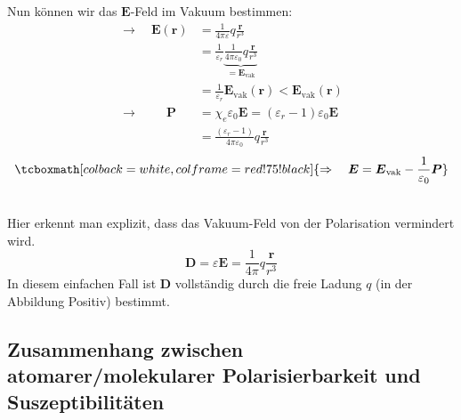 \documentclass[titlepage,11pt,a4paper,ngerman]{report}
\newcommand{\tx}[1]{\textrm{#1}}
\newcommand{\ub}[1]{\underbrace{#1}}
\newcommand{\eofr}{\vec{E}(\vec{r})}
\newcommand{\kq}{\frac{1}{4\pi\epsilon_0}}
\renewcommand{\vec}[1]{\boldsymbol{#1}}
\newcommand{\lcom}[1]{\color{MidnightBlue}#1\color{black}}
\renewcommand{\epsilon}{\varepsilon}
\newcommand{\rmbox}[1]{\tcboxmath[colback=white,colframe=red!75!black]{#1}}
\begin{document}
\noindent
\begin{minipage}{.6\linewidth}
	Nun können wir das $ \vec{E} $-Feld im Vakuum bestimmen:
	\begin{align*}
	\rightarrow \quad \eofr &= \frac{1}{4 \pi \epsilon} q \frac{\vec{r}}{r^3} \\
	&= \frac{1}{\epsilon_r} \ub{\kq q \frac{\vec{r}}{r^3}}_{= \vec{E}_{\tx{vak}}}\\
	&= \frac{1}{\epsilon_r} \vec{E}_{\tx{vak}} (\vec{r}) < \vec{E}_{\tx{vak}}(\vec{r})\\[10pt]
	\rightarrow \qquad \ \vec{P} &= \chi_e \epsilon_0 \vec{E} = (\epsilon_r - 1) \epsilon_0 \vec{E}\\
	&= \frac{(\epsilon_r - 1)}{4 \pi \epsilon_0} q \frac{\vec{r}}{r^3}
	\end{align*}
	\begin{equation*}
	\rmbox{\Rightarrow \quad \vec{E} = \vec{E}_{\tx{vak}} - \frac{1}{\epsilon_0} \vec{P}}
	\end{equation*}
	\vspace{3pt}
\end{minipage}%
\begin{minipage}{.4\linewidth}
	\centering
\end{minipage}%
\\
\lcom{Hier erkennt man explizit, dass das Vakuum-Feld von der Polarisation vermindert wird.}
\begin{equation*}
\vec{D} = \epsilon \vec{E} = \frac{1}{4 \pi} q \frac{\vec{r}}{r^3}
\end{equation*}
\lcom{In diesem einfachen Fall ist $ \vec{D} $ vollständig durch die freie Ladung $ q $ (in der Abbildung Positiv) bestimmt.}

\subsection{Zusammenhang zwischen atomarer/molekularer Polarisierbarkeit und Suszeptibilitäten}
\end{document}
